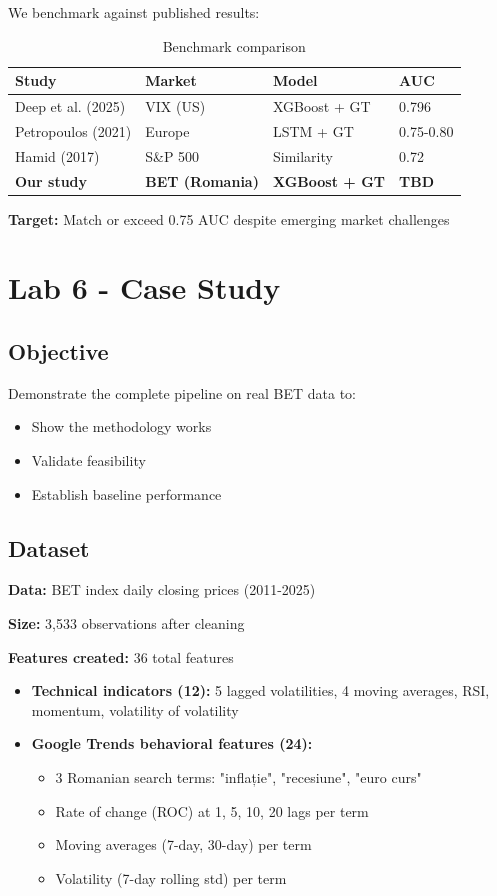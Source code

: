 \documentclass[12pt,a4paper]{article}
\begin{document}
We benchmark against published results:

\begin{table}[h]
\centering
\begin{tabular}{llll}
\hline
\textbf{Study} & \textbf{Market} & \textbf{Model} & \textbf{AUC} \\
\hline
Deep et al. (2025) & VIX (US) & XGBoost + GT & 0.796 \\
Petropoulos (2021) & Europe & LSTM + GT & 0.75-0.80 \\
Hamid (2017) & S\&P 500 & Similarity & 0.72 \\
\hline
\textbf{Our study} & \textbf{BET (Romania)} & \textbf{XGBoost + GT} & \textbf{TBD} \\
\hline
\end{tabular}
\caption{Benchmark comparison}
\end{table}

\textbf{Target:} Match or exceed 0.75 AUC despite emerging market challenges

\newpage
\section{Lab 6 - Case Study}

\subsection{Objective}

Demonstrate the complete pipeline on real BET data to:
\begin{itemize}
    \item Show the methodology works
    \item Validate feasibility
    \item Establish baseline performance
\end{itemize}

\subsection{Dataset}

\textbf{Data:} BET index daily closing prices (2011-2025)

\textbf{Size:} 3,533 observations after cleaning

\textbf{Features created:} 36 total features
\begin{itemize}
    \item \textbf{Technical indicators (12):} 5 lagged volatilities, 4 moving averages, RSI, momentum, volatility of volatility
    \item \textbf{Google Trends behavioral features (24):}
    \begin{itemize}
        \item 3 Romanian search terms: "inflație", "recesiune", "euro curs"
        \item Rate of change (ROC) at 1, 5, 10, 20 lags per term
        \item Moving averages (7-day, 30-day) per term
        \item Volatility (7-day rolling std) per term
    \end{itemize}
\end{itemize}
\end{document}
